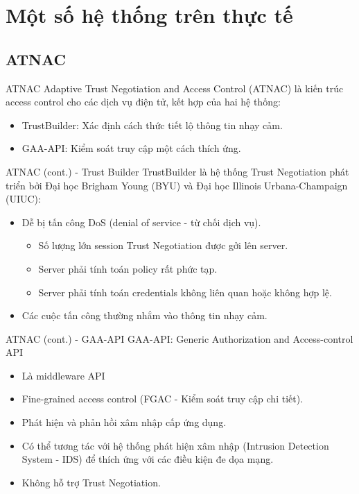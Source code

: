 \documentclass[11pt]{beamer}
\begin{document}
\section{Một số hệ thống trên thực tế}
\subsection{ATNAC}
\begin{frame}{ATNAC}
Adaptive Trust Negotiation and Access Control (ATNAC)\cite{10.1145/1063979.1064004} là kiến trúc access control cho các dịch vụ điện tử, kết hợp của hai hệ thống:
\begin{itemize}
\item TrustBuilder: Xác định cách thức tiết lộ thông tin nhạy cảm.
\item GAA-API: Kiểm soát truy cập một cách thích ứng.
\end{itemize}
\end{frame}

\begin{frame}{ATNAC (cont.) - Trust Builder}
TrustBuilder là hệ thống Trust Negotiation phát triển bởi Đại học Brigham Young (BYU) và Đại học Illinois Urbana-Champaign (UIUC):
\begin{itemize}
\item Dễ bị tấn công DoS (denial of service - từ chối dịch vụ).
\begin{itemize}
\item Số lượng lớn session Trust Negotiation được gởi lên server.
\item Server phải tính toán policy rất phức tạp.
\item Server phải tính toán credentials không liên quan hoặc không hợp lệ.
\end{itemize}
\item Các cuộc tấn công thường nhắm vào thông tin nhạy cảm.
\end{itemize}
\end{frame}

\begin{frame}{ATNAC (cont.) - GAA-API}
GAA-API: Generic Authorization and Access-control API
\begin{itemize}
\item Là middleware API
\item Fine-grained access control (FGAC - Kiểm soát truy cập chi tiết).
\item Phát hiện và phản hồi xâm nhập cấp ứng dụng.
\item Có thể tương tác với hệ thống phát hiện xâm nhập (Intrusion Detection System - IDS) để thích ứng với các điều kiện đe dọa mạng.
\item Không hỗ trợ Trust Negotiation.
\end{itemize}
\end{frame}
\end{document}

